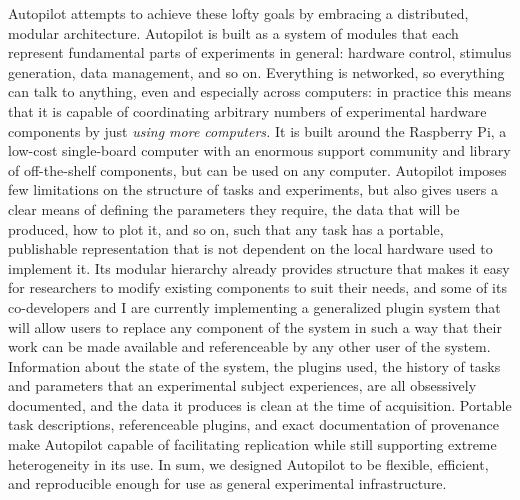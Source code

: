 \documentclass[11pt]{article}
\begin{document}
\begin{multicols}{2}
Autopilot attempts to achieve these lofty goals by embracing a
distributed, modular architecture. Autopilot is built as a system of
modules that each represent fundamental parts of experiments in general:
hardware control, stimulus generation, data management, and so on.
Everything is networked, so everything can talk to anything, even and
especially across computers: in practice this means that it is capable
of coordinating arbitrary numbers of experimental hardware components by
just \emph{using more computers.} It is built around the Raspberry Pi, a
low-cost single-board computer with an enormous support community and
library of off-the-shelf components, but can be used on any computer.
Autopilot imposes few limitations on the structure of tasks and
experiments, but also gives users a clear means of defining the
parameters they require, the data that will be produced, how to plot it,
and so on, such that any task has a portable, publishable representation
that is not dependent on the local hardware used to implement it. Its
modular hierarchy already provides structure that makes it easy for
researchers to modify existing components to suit their needs, and some
of its co-developers and I are currently implementing a generalized
plugin system that will allow users to replace any component of the
system in such a way that their work can be made available and
referenceable by any other user of the system. Information about the
state of the system, the plugins used, the history of tasks and
parameters that an experimental subject experiences, are all obsessively
documented, and the data it produces is clean at the time of
acquisition. Portable task descriptions, referenceable plugins, and
exact documentation of provenance make Autopilot capable of facilitating
replication while still supporting extreme heterogeneity in its use. In
sum, we designed Autopilot to be flexible, efficient, and reproducible
enough for use as general experimental infrastructure.


\end{multicols}
\end{document}
